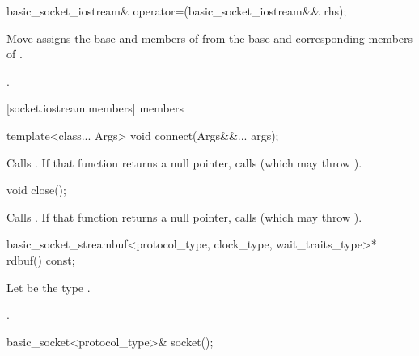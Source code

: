 \begin{itemdecl}
basic_socket_iostream& operator=(basic_socket_iostream&& rhs);
\end{itemdecl}

\begin{itemdescr}
\pnum
\effects Move assigns the base and members of  from the base and corresponding members of .

\pnum
\returns {}.
\end{itemdescr}



[socket.iostream.members]{ members}

\begin{itemdecl}
template<class... Args>
  void connect(Args&&... args);
\end{itemdecl}


\begin{itemdescr}
\pnum
\effects Calls . If that function returns a null pointer, calls  (which may throw ).
\end{itemdescr}

\begin{itemdecl}
void close();
\end{itemdecl}

\begin{itemdescr}
\pnum
\effects Calls . If that function returns a null pointer, calls  (which may throw ).
\end{itemdescr}

\begin{itemdecl}
basic_socket_streambuf<protocol_type, clock_type, wait_traits_type>* rdbuf() const;
\end{itemdecl}

\begin{itemdescr}
\pnum
Let  be the type .

\pnum
\returns {}.
\end{itemdescr}

\begin{itemdecl}
basic_socket<protocol_type>& socket();
\end{itemdecl}

